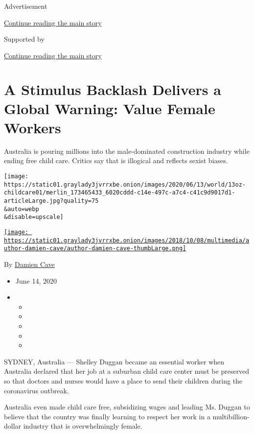 Advertisement

\protect\hyperlink{after-top}{Continue reading the main story}

Supported by

\protect\hyperlink{after-sponsor}{Continue reading the main story}

\hypertarget{a-stimulus-backlash-delivers-a-global-warning-value-female-workers}{%
\section{A Stimulus Backlash Delivers a Global Warning: Value Female
Workers}\label{a-stimulus-backlash-delivers-a-global-warning-value-female-workers}}

Australia is pouring millions into the male-dominated construction
industry while ending free child care. Critics say that is illogical and
reflects sexist biases.

\texttt{[image: https://static01.graylady3jvrrxbe.onion/images/2020/06/13/world/13oz-childcare01/merlin\_173465433\_6020cddd-c14e-497c-a7c4-c41c9d9017d1-articleLarge.jpg?quality=75\\\&auto=webp\\\&disable=upscale]}

\href{https://www.nytimes3xbfgragh.onion/by/damien-cave}{\texttt{[image: https://static01.graylady3jvrrxbe.onion/images/2018/10/08/multimedia/author-damien-cave/author-damien-cave-thumbLarge.png]}}

By \href{https://www.nytimes3xbfgragh.onion/by/damien-cave}{Damien Cave}

\begin{itemize}
\item
  June 14, 2020
\item
  \begin{itemize}
  \item
  \item
  \item
  \item
  \item
  \end{itemize}
\end{itemize}

SYDNEY, Australia --- Shelley Duggan became an essential worker when
Australia declared that her job at a suburban child care center must be
preserved so that doctors and nurses would have a place to send their
children during the coronavirus outbreak.

Australia even made child care free, subsidizing wages and leading Ms.
Duggan to believe that the country was finally learning to respect her
work in a multibillion-dollar industry that is overwhelmingly female.

